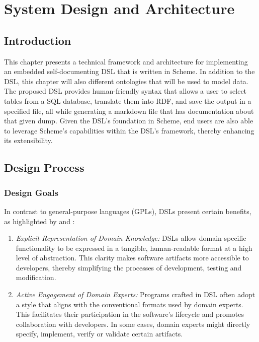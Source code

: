 \chapter{System Design and Architecture}

\section{Introduction}

This chapter presents a technical framework and architecture for implementing an embedded self-documenting DSL that is written in Scheme.  In addition to the DSL, this chapter will also different ontologies that will be used to model data.  The proposed DSL provides human-friendly syntax that allows a user to select tables from a SQL database, translate them into RDF, and save the output in a specified file, all while generating a markdown file that has documentation about that given dump.  Given the DSL's foundation in Scheme, end users are also able to leverage Scheme's capabilities within the DSL's framework, thereby enhancing its extensibility.

\section{Design Process}

\subsection{Design Goals}

In contrast to general-purpose languages (GPLs), DSLs present certain benefits, as highlighted by \citet{freudenthal2010domain} and \citet{spinellis2001notable}:

\begin{enumerate}
\item \textit{Explicit Representation of Domain Knowledge:} DSLs allow domain-specific functionality to be expressed in a tangible, human-readable format at a high level of abstraction.  This clarity makes software artifacts more accessible to developers, thereby simplifying the processes of development, testing and modification.
\item \textit{Active Engagement of Domain Experts:} Programs crafted in DSL often adopt a style that aligns with the conventional formats used by domain experts.  This facilitates their participation in the software's lifecycle and promotes collaboration with developers. In some cases, domain experts might directly specify, implement, verify or validate certain artifacts.
\end{enumerate}

